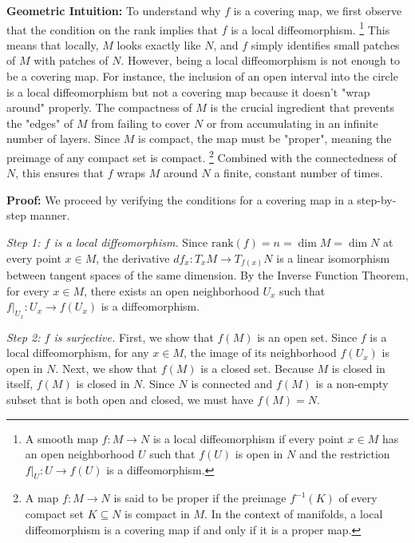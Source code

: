 \begin{solution}
\textbf{Geometric Intuition:} To understand why $f$ is a covering map, we first observe that the condition on the rank implies that $f$ is a local diffeomorphism.
\footnote{A smooth map $f: M \to N$ is a local diffeomorphism if every point $x \in M$ has an open neighborhood $U$ such that $f(U)$ is open in $N$ and the restriction $f|_U: U \to f(U)$ is a diffeomorphism.}
This means that locally, $M$ looks exactly like $N$, and $f$ simply identifies small patches of $M$ with patches of $N$. However, being a local diffeomorphism is not enough to be a covering map. For instance, the inclusion of an open interval into the circle is a local diffeomorphism but not a covering map because it doesn't "wrap around" properly.
The compactness of $M$ is the crucial ingredient that prevents the "edges" of $M$ from failing to cover $N$ or from accumulating in an infinite number of layers. Since $M$ is compact, the map must be "proper", meaning the preimage of any compact set is compact.
\footnote{A map $f: M \to N$ is said to be proper if the preimage $f^{-1}(K)$ of every compact set $K \subseteq N$ is compact in $M$. In the context of manifolds, a local diffeomorphism is a covering map if and only if it is a proper map.}
Combined with the connectedness of $N$, this ensures that $f$ wraps $M$ around $N$ a finite, constant number of times.

\textbf{Proof:} We proceed by verifying the conditions for a covering map in a step-by-step manner.

\textit{Step 1: $f$ is a local diffeomorphism.}
Since $\text{rank}(f) = n = \dim M = \dim N$ at every point $x \in M$, the derivative $df_x: T_x M \to T_{f(x)} N$ is a linear isomorphism between tangent spaces of the same dimension. By the Inverse Function Theorem, for every $x \in M$, there exists an open neighborhood $U_x$ such that $f|_{U_x}: U_x \to f(U_x)$ is a diffeomorphism.

\textit{Step 2: $f$ is surjective.}
First, we show that $f(M)$ is an open set. Since $f$ is a local diffeomorphism, for any $x \in M$, the image of its neighborhood $f(U_x)$ is open in $N$.
Next, we show that $f(M)$ is a closed set.
Because $M$ is closed in itself, $f(M)$ is closed in $N$. Since $N$ is connected and $f(M)$ is a non-empty subset that is both open and closed, we must have $f(M) = N$.


\end{solution}
